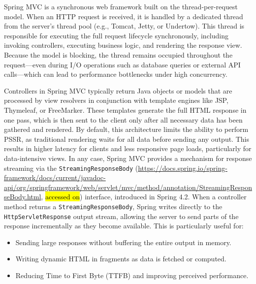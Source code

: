 \documentclass[software,article,accept,pdftex,moreauthors]{Definitions/mdpi}
\begin{document}
Spring MVC is a synchronous web framework built on the thread-per-request
model. When an HTTP request is received, it is handled by a dedicated thread
from the server’s thread pool (e.g., Tomcat, Jetty, or Undertow). This thread
is responsible for executing the full request lifecycle synchronously,
including invoking controllers, executing business logic, and rendering the
response view. Because the model is blocking, the thread remains occupied
throughout the request---even during I/O operations such as database queries or
external API calls---which can lead to performance bottlenecks under high
concurrency.

Controllers in Spring MVC typically return Java objects or models that are
processed by view resolvers in conjunction with template engines like JSP,
Thymeleaf, or FreeMarker. These templates generate the full HTML response in
one pass, which is then sent to the client only after all necessary data has
been gathered and rendered. By default, this architecture limits the ability to
perform PSSR, as traditional rendering waits for all data before sending any
output. This results in higher latency for clients and less responsive page
loads, particularly for data-intensive views. In any case, Spring MVC provides a
mechanism for response streaming via the
\texttt{StreamingResponseBody} ({\url{https://docs.spring.io/spring-framework/docs/current/javadoc-api/org/springframework/web/servlet/mvc/method/annotation/StreamingResponseBody.html}}, \hl{accessed on})
interface, introduced in Spring 4.2. When a controller method returns a
\texttt{StreamingResponseBody}, Spring writes directly to the
\texttt{HttpServletResponse} output stream, allowing the server to send parts
of the response incrementally as they become available. This is particularly
useful for:
\begin{itemize}
    \item Sending large responses without buffering the entire output in memory.
    \item Writing dynamic HTML in fragments as data is fetched or computed.
    \item Reducing Time to First Byte (TTFB) and improving perceived performance.
\end{itemize}
\end{document}
